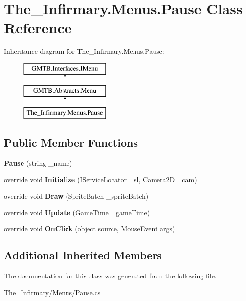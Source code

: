\hypertarget{class_the___infirmary_1_1_menus_1_1_pause}{}\section{The\+\_\+\+Infirmary.\+Menus.\+Pause Class Reference}
\label{class_the___infirmary_1_1_menus_1_1_pause}
Inheritance diagram for The\+\_\+\+Infirmary.\+Menus.\+Pause\+:\begin{figure}[H]
\begin{center}
\leavevmode
\includegraphics[height=3.000000cm]{class_the___infirmary_1_1_menus_1_1_pause}
\end{center}
\end{figure}
\subsection*{Public Member Functions}
\begin{DoxyCompactItemize}
\item 
\mbox{\label{class_the___infirmary_1_1_menus_1_1_pause_a19f191bc0f0f1b8d7d4ff8671fea5340}} 
{\bfseries Pause} (string \+\_\+name)
\item 
\mbox{\label{class_the___infirmary_1_1_menus_1_1_pause_afc050c562bee05ec6f76d5fa8e35732f}} 
override void {\bfseries Initialize} (\mbox{\hyperlink{interface_g_m_t_b_1_1_interfaces_1_1_i_service_locator}{I\+Service\+Locator}} \+\_\+sl, \mbox{\hyperlink{class_g_m_t_b_1_1_camera2_d}{Camera2D}} \+\_\+cam)
\item 
\mbox{\label{class_the___infirmary_1_1_menus_1_1_pause_aa1f832b2cb74ca98bbb1a8d48629aab9}} 
override void {\bfseries Draw} (Sprite\+Batch \+\_\+sprite\+Batch)
\item 
\mbox{\label{class_the___infirmary_1_1_menus_1_1_pause_a620806b975abd00dd150a10648351318}} 
override void {\bfseries Update} (Game\+Time \+\_\+game\+Time)
\item 
\mbox{\label{class_the___infirmary_1_1_menus_1_1_pause_a780ea260c8e45b3a1fc09dfe73177ced}} 
override void {\bfseries On\+Click} (object source, \mbox{\hyperlink{class_g_m_t_b_1_1_input_system_1_1_mouse_event}{Mouse\+Event}} args)
\end{DoxyCompactItemize}
\subsection*{Additional Inherited Members}


The documentation for this class was generated from the following file\+:\begin{DoxyCompactItemize}
\item 
The\+\_\+\+Infirmary/\+Menus/Pause.\+cs\end{DoxyCompactItemize}
